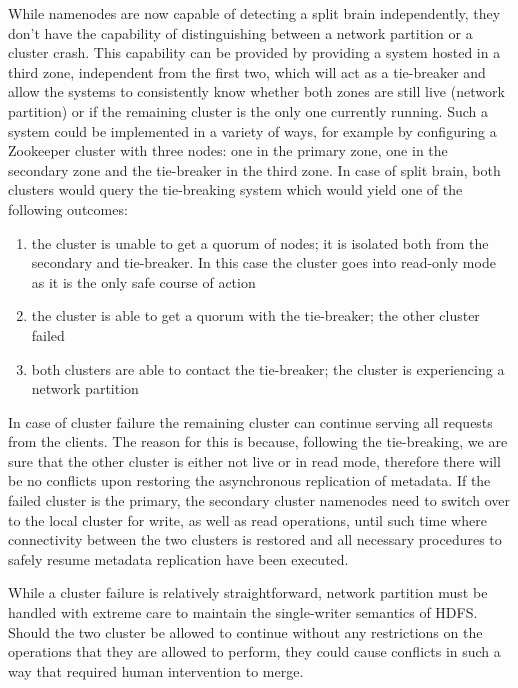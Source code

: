 While namenodes are now capable of detecting a split brain independently, they don't have the capability of distinguishing between a network partition or a cluster crash.
This capability can be provided by providing a system hosted in a third zone, independent from the first two, which will act as a tie-breaker and allow the systems to consistently know whether both zones are still live (network partition) or if the remaining cluster is the only one currently running.
Such a system could be implemented in a variety of ways, for example by configuring a Zookeeper \cite{DBLP:conf/usenix/HuntKJR10} cluster with three nodes: one in the primary zone, one in the secondary zone and the tie-breaker in the third zone.
In case of split brain, both clusters would query the tie-breaking system which would yield one of the following outcomes:
\begin{enumerate}
    \item the cluster is unable to get a quorum of nodes; it is isolated both from the secondary and tie-breaker. In this case the cluster goes into read-only mode as it is the only safe course of action
    \item the cluster is able to get a quorum with the tie-breaker; the other cluster failed
    \item both clusters are able to contact the tie-breaker; the cluster is experiencing a network partition
\end{enumerate}

In case of cluster failure the remaining cluster can continue serving all requests from the clients.
The reason for this is because, following the tie-breaking, we are sure that the other cluster is either not live or in read mode, therefore there will be no conflicts upon restoring the asynchronous replication of metadata.
If the failed cluster is the primary, the secondary cluster namenodes need to switch over to the local cluster for write, as well as read operations, until such time where connectivity between the two clusters is restored and all necessary procedures to safely resume metadata replication have been executed.

While a cluster failure is relatively straightforward, network partition must be handled with extreme care to maintain the single-writer semantics of HDFS.
Should the two cluster be allowed to continue without any restrictions on the operations that they are allowed to perform, they could cause conflicts in such a way that required human intervention to merge.

